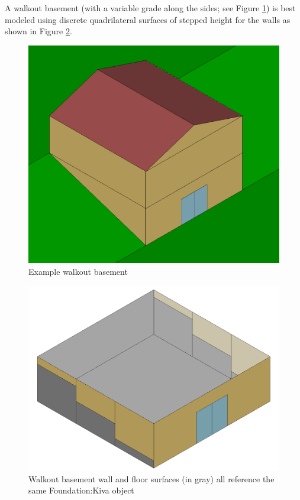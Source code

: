A walkout basement (with a variable grade along the sides; see Figure
\ref{fig:wo-r}) is best modeled using discrete quadrilateral surfaces of
stepped height for the walls as shown in Figure \ref{fig:wo-s}.

\begin{figure}
\centering
\includegraphics{media/kiva-walkout-real.png}
\caption{Example walkout basement\label{fig:wo-r}}
\end{figure}

\begin{figure}
\centering
\includegraphics{media/kiva-walkout-segs.png}
\caption{Walkout basement wall and floor surfaces (in gray) all
reference the same Foundation:Kiva object\label{fig:wo-s}}
\end{figure}

